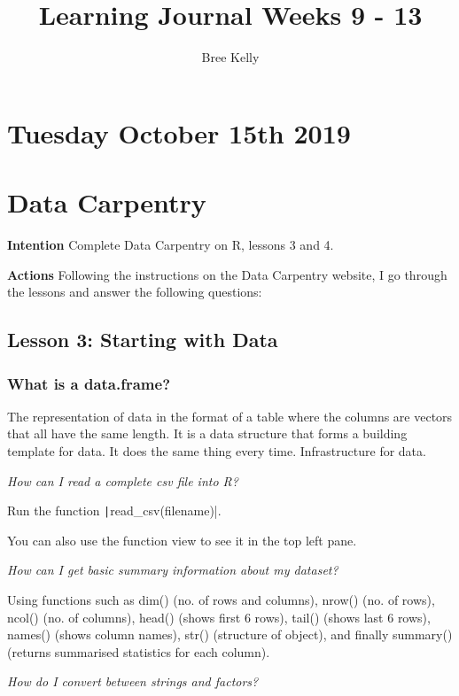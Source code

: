 \documentclass{article}
\title{Learning Journal Weeks 9 - 13}
\author{Bree Kelly}
\date{}
\begin{document}
\maketitle

\tablesofcontentsanderrors

\section{Tuesday October 15th 2019}

\section{Data Carpentry}
\textbf{Intention} Complete Data Carpentry on R, lessons 3 and 4.

\textbf{Actions} Following the instructions on the Data Carpentry website, I go through the lessons and answer the following questions:

\subsection{Lesson 3: Starting with Data}

\subsubsection{What is a data.frame?}

The representation of data in the format of a table where the columns are vectors that all have the same length. It is a data structure that forms a building template for data. It does the same thing every time. Infrastructure for data.

\textit{How can I read a complete csv file into R?}

Run the function \texttt|read_csv(filename)|. 

You can also use the function view to see it in the top left pane.

\textit{How can I get basic summary information about my dataset?}

Using functions such as dim() (no. of rows and columns), nrow() (no. of rows), ncol() (no. of columns), head() (shows first 6 rows), tail() (shows last 6 rows), names() (shows column names), str() (structure of object), and finally summary() (returns summarised statistics for each column).

\textit{How do I convert between strings and factors?}
\end{document}
